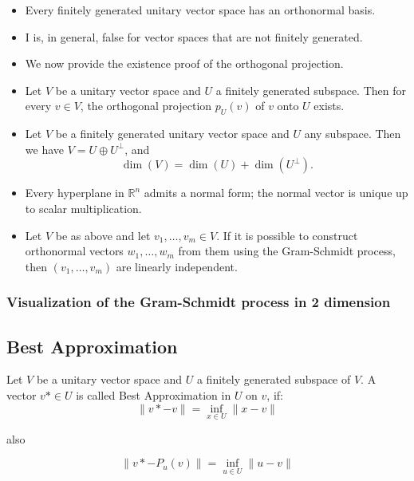 \begin{itemize}[label=\(-\)]

    \item Every finitely generated unitary vector space has an orthonormal basis.

    \item I is, in general, false for vector spaces that are not finitely generated.

    \item We now provide the existence proof of the orthogonal projection.

    \item Let \( V \) be a unitary vector space and \( U \) a finitely generated subspace. Then for every \( v \in V \), the orthogonal projection \( p_U(v) \) of \( v \) onto \( U \) exists.
    
    \item Let \( V \) be a finitely generated unitary vector space and \( U \) any subspace. Then we have \( V = U \oplus U^\perp \), and
    \[
    \dim(V) = \dim(U) + \dim(U^\perp).
    \]
    
    \item Every hyperplane in \( \mathbb{R}^n \) admits a normal form; the normal vector is unique up to scalar multiplication.
    
    \item Let \( V \) be as above and let \( v_1, \ldots, v_m \in V \). If it is possible to construct orthonormal vectors \( w_1, \ldots, w_m \) from them using the Gram-Schmidt process, then \( (v_1, \ldots, v_m) \) are linearly independent.
    
\end{itemize}


\subsubsection*{Visualization of the Gram-Schmidt process in 2 dimension}

\begin{center}
\end{center}

\subsection{Best Approximation}

Let \(V\) be a unitary vector space and \(U\) a finitely generated subspace of \(V\).
A vector \(v* \in U\) is called Best Approximation in \(U\) on \(v\), if:
\[
\|v* - v\| = \inf_{x \in U}\|x - v\|
\]

 also

\[
\|v* - P_u(v)\| = \inf_{u \in U}\|u - v\|
\]


